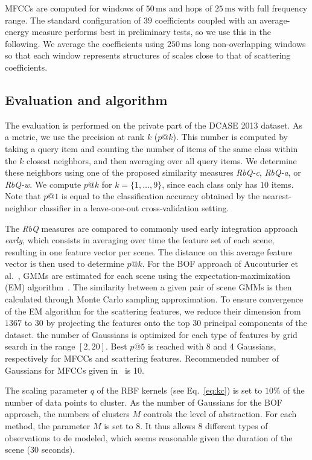 \documentclass[smallextended]{svjour3}
\begin{document}
MFCCs are computed for windows of $50\,\mathrm{ms}$ and hops of $25\,\mathrm{ms}$ with full frequency range. The standard configuration of $39$ coefficients coupled with an average-energy measure performs best in preliminary tests, so we use this in the following. We average the coefficients using $250\,\mathrm{ms}$ long non-overlapping windows so that each window represents structures of scales close to that of scattering coefficients.

\subsection{Evaluation and algorithm}

The evaluation is performed on the private part of the DCASE 2013 dataset. As a metric, we use the precision at rank $k$ ($p@k$). This number is computed by taking a query item and counting the number of items of the same class within the $k$ closest neighbors, and then averaging over all query items. We determine these neighbors using one of the proposed similarity measures \emph{RbQ-c}, \emph{RbQ-a}, or \emph{RbQ-w}. We compute $p@k$ for $k=\lbrace 1,\ldots,9\rbrace$, since each class only has $10$ items. Note that $p@1$ is equal to the classification accuracy obtained by the nearest-neighbor classifier in a leave-one-out cross-validation setting.

The \emph{RbQ} measures are compared to commonly used early integration approach \emph{early}, which consists in averaging over time the feature set of each scene, resulting in one feature vector per scene. The distance on this average feature vector is then used to determine $p@k$. For the BOF approach of Aucouturier et al.~\cite{aucouturier2007bag}, GMMs are estimated for each scene using the expectation-maximization (EM) algorithm~\cite{dempster-laird, moon1996expectation}. The similarity between a given pair of scene GMMs is then calculated through Monte Carlo sampling approximation. To ensure convergence of the EM algorithm for the scattering features, we reduce their dimension from $1367$ to $30$ by projecting the features onto the top $30$ principal components of the dataset. the number of Gaussians is optimized for each type of features by grid search in the range $[2, 20]$. Best $p@5$ is reached with 8 and 4  Gaussians, respectively for MFCCs and scattering features. Recommended number of Gaussians for MFCCs given in~\cite{aucouturier2007bag} is 10.

The scaling parameter $q$ of the RBF kernels (see Eq.~\ref{eq:kc}) is set to $10\%$ of the number of data points to cluster.  As the number of Gaussians for the BOF approach, the numbers of clusters $M$ controls the level of abstraction. For each method, the parameter $M$ is set to $8$. It thus allows $8$ different types of observations to de modeled, which seems reasonable given the duration of the scene (30 seconds).
\end{document}
